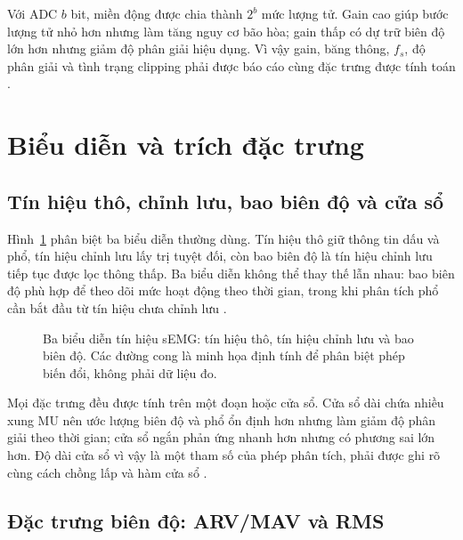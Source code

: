 Với ADC $b$ bit, miền động được chia thành $2^b$ mức lượng tử. Gain cao
giúp bước lượng tử nhỏ hơn nhưng làm tăng nguy cơ bão hòa; gain thấp có
dự trữ biên độ lớn hơn nhưng giảm độ phân giải hiệu dụng. Vì vậy gain,
băng thông, $f_s$, độ phân giải và tình trạng clipping phải được báo cáo
cùng đặc trưng được tính toán \cite{merletti1999standards,besomi2024cede}.

\section{Biểu diễn và trích đặc trưng}
\label{sec:features}

\subsection{Tín hiệu thô, chỉnh lưu, bao biên độ và cửa sổ}
\label{sec:representations}

Hình~\ref{fig:signal-representations} phân biệt ba biểu diễn thường dùng.
Tín hiệu thô giữ thông tin dấu và phổ, tín hiệu chỉnh lưu lấy trị tuyệt
đối, còn bao biên độ là tín hiệu chỉnh lưu tiếp tục được lọc thông thấp.
Ba biểu diễn không thể thay thế lẫn nhau: bao biên độ phù hợp để theo dõi
mức hoạt động theo thời gian, trong khi phân tích phổ cần bắt đầu từ tín
hiệu chưa chỉnh lưu \cite{merletti1999standards,mcmanus2020analysis}.

\begin{figure}[htbp]
    \centering
    
    \caption{Ba biểu diễn tín hiệu sEMG: tín hiệu thô, tín hiệu chỉnh lưu và
    bao biên độ. Các đường cong là minh họa định tính để phân biệt phép
    biến đổi, không phải dữ liệu đo.}
    \label{fig:signal-representations}
\end{figure}

Mọi đặc trưng đều được tính trên một đoạn hoặc cửa sổ. Cửa sổ dài chứa
nhiều xung MU nên ước lượng biên độ và phổ ổn định hơn nhưng làm giảm độ
phân giải theo thời gian; cửa sổ ngắn phản ứng nhanh hơn nhưng có phương
sai lớn hơn. Độ dài cửa sổ vì vậy là một tham số của phép phân tích, phải
được ghi rõ cùng cách chồng lấp và hàm cửa sổ
\cite{muceli2024tutorial,merletti1999standards}.

\subsection{Đặc trưng biên độ: ARV/MAV và RMS}
\label{sec:amplitude-features}

